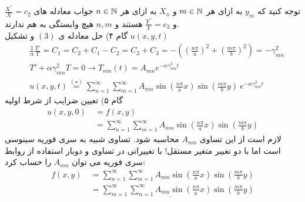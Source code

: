 توجه کنید که 
$y_m$
به ازای هر 
$m\in\mathbb{N}$
و
$X_n$
به ازای هر 
$n\in\mathbb{N}$
جواب معادله های 
$\frac{X^{''}}{X}=c_2$
و
$\frac{Y^{''}}{Y}=c_3$
هستند و 
$n,m$
هیچ وابستگی به هم ندارند.\\
گام ۴) حل معادله ی
$(3)$
و تشکیل
$u(x,y,t)$
\begin{equation*}
	\begin{aligned}
		{} &\
		\frac{1}{\alpha}\frac{T'}{T}= C_{1}=C_{2} +C_{1}-C_{2}= C_{2}+C_{3}=-\left(\left(\frac{n \pi}{a}\right)^{2}+\left(\frac{m \pi}{b}\right)^{2}\right)=-\gamma_{mn}^{2}
		\\ &\
		T'+\alpha \gamma_{m n}^{2}T=0 \rightarrow T_{mn}(t)=A_{mn}e^{-\alpha \gamma_{m n}^{2} t}
		\\ &\
		u(x, y, t) \overset{(\star)}{=}\sum_{n=1}^{\infty}\sum_{m=1}^{\infty} A_{mn} \sin \left(\frac{n \pi}{a} x\right) \sin \left(\frac{m \pi }{b}y\right)\  e^{-\alpha \gamma_{m n}^{2} t}
	\end{aligned}
\end{equation*}
گام ۵) تعیین ضرایب از شرط اولیه
\begin{equation*}
	\begin{aligned}
		u(x, y, 0)  {}&\
		=f(x,y)
		\\ &\
		=\sum_{n=1}^{\infty}\sum_{m=1}^{\infty} A_{mn} \sin \left(\frac{n \pi}{a} x\right) \sin \left(\frac{m \pi }{b}y\right)
	\end{aligned}
\end{equation*}
لازم است از این تساوی 
$A_{mn}$
محاسبه شود. تساوی شبیه به سری فوریه سینوسی است اما با دو تغییر متغیر مستقل! با تغییراتی در تساوی و دوبار استفاده از روابط سری فوریه می توان
$A_{mn}$
را حساب کرد:
\begin{equation*}
	\begin{aligned}
		f(x,y) {} &\
		=\sum_{n=1}^{\infty}\sum_{m=1}^{\infty} A_{mn} \sin \left(\frac{n \pi}{a} x\right) \sin \left(\frac{m \pi }{b}y\right)
		\\ &\
		=\sum_{m=1}^{\infty}\underline{\sum_{n=1}^{\infty} A_{mn} \sin \left(\frac{n \pi}{a} x\right) }\sin \left(\frac{m \pi }{b}y\right)
	\end{aligned}
\end{equation*}
